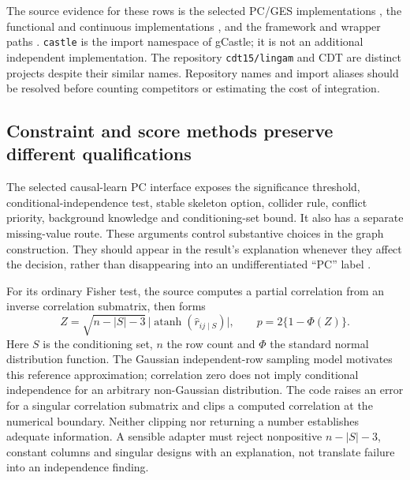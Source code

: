 The source evidence for these rows is the selected PC/GES implementations
\citep{exec13_pydisc_causallearn,exec13_pydisc_pgmpy}, the functional and
continuous implementations
\citep{exec13_pydisc_lingam,exec13_pydisc_notears,exec13_pydisc_dagma,exec13_pydisc_gcastle},
and the framework and wrapper paths
\citep{exec13_pydisc_causalnex,exec13_pydisc_causica,exec13_pydisc_cdt}.
\texttt{castle} is the import namespace of gCastle; it is not an additional
independent implementation. The repository \texttt{cdt15/lingam} and CDT are
distinct projects despite their similar names. Repository names and import
aliases should be resolved before counting competitors or estimating the
cost of integration.

\subsection{Constraint and score methods preserve different qualifications}

The selected causal-learn PC interface exposes the significance threshold,
conditional-independence test, stable skeleton option, collider rule, conflict
priority, background knowledge and conditioning-set bound. It also has a
separate missing-value route. These arguments control substantive choices in
the graph construction. They should appear in the result's explanation whenever
they affect the decision, rather than disappearing into an undifferentiated
``PC'' label \citep{exec13_pydisc_causallearn}.

For its ordinary Fisher test, the source computes a partial correlation from
an inverse correlation submatrix, then forms
\begin{equation}
 Z=\sqrt{n-|S|-3}\,\bigl|\operatorname{atanh}(\widehat r_{ij\mid S})\bigr|,
 \qquad p=2\{1-\Phi(Z)\}.
\end{equation}
Here \(S\) is the conditioning set, \(n\) the row count and \(\Phi\) the
standard normal distribution function. The Gaussian independent-row sampling
model motivates this reference approximation; correlation zero does not imply
conditional independence for an arbitrary non-Gaussian distribution. The code
raises an error for a singular correlation submatrix and clips a computed
correlation at the numerical boundary. Neither clipping nor returning a
number establishes adequate information. A sensible adapter must reject
nonpositive \(n-|S|-3\), constant columns and singular designs with an
explanation, not translate failure into an independence finding.

